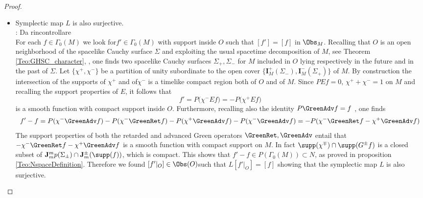 \documentclass[Main]{subfiles}
\begin{document}
\begin{proof}
\begin{itemize}
								\item Symplectic map $L$ is also surjective.
																		\\ \danger: Da rincontrollare	\\
									For each $f\in \Gamma_0(M)$ we look for$ f' \in \Gamma_0(M)$ with support inside $O$ such that $[f']=[f]$ in $\Obs_M$.
									Recalling that $O$ is an open neighborhood of the spacelike Cauchy surface $\Sigma$ and exploiting the usual spacetime decomposition of $M$, see Theorem \ref{Teo:GHSC_character}, , one finds two spacelike Cauchy surfaces $\Sigma_+,\Sigma_-$ for $M$ included in $O$ lying respectively in the future and in the past of $\Sigma$. Let $\{\chi^+,\chi^-\}$ be a partition of unity subordinate to the open cover $\{\mathbf{I}^+_M(\Sigma_-), \mathbf{I}^-_M(\Sigma_+)\}$ of $M$. 
									By construction the intersection of the supports of $\chi^+$ and of$\chi^-$ is a timelike compact region both of $O$ and of $M$. 
									Since $PE f = 0$, $\chi^+ +\chi^-=1$ on $M$ and recalling the support properties of $E$, it follows that 
									\begin{displaymath}
									f' = P\big( \chi^- E f \big) =  - P \big( \chi^+ E f \big)
									\end{displaymath}
									is a smooth function with compact support inside $O$. 
									Furthermore, recalling also the identity $P \GreenAdv f = f$ , one finds
									\begin{displaymath}
									f' -f = P(\chi^- \GreenAdv f) - P ( \chi^- \GreenRet f ) - P ( \chi^+ \GreenAdv f) - P(\chi^- \GreenAdv f) = - P(\chi^- \GreenRet f - \chi^+ \GreenAdv f )
									\end{displaymath}
									The support properties of both the retarded and advanced Green operators $\GreenRet, \GreenAdv$ entail that $-\chi^-\GreenRet f - \chi^+ \GreenAdv f$ is a smooth function with compact support on $M$. In fact $\supp(\chi^\mp) \cap \supp(G^\pm f )$ is a closed subset of $\mathbf{J}_m^mp(\Sigma_\pm) \cap \mathbf{J}_m^\pm(\supp(f))$, which is compact.
									This shows that $f' -f \in P(\Gamma_0(M)) \subset N$, as proved in proposition \ref{Teo:NspaceDefinition}. 
									Therefore we found $[ f'\vert_O] \in \Obs(O)$such that $L[ f'\vert_O]=[ f ]$ showing that the symplectic map $L$ is also surjective.
					\end{itemize}		
				\end{proof}
				

							
\end{document}
